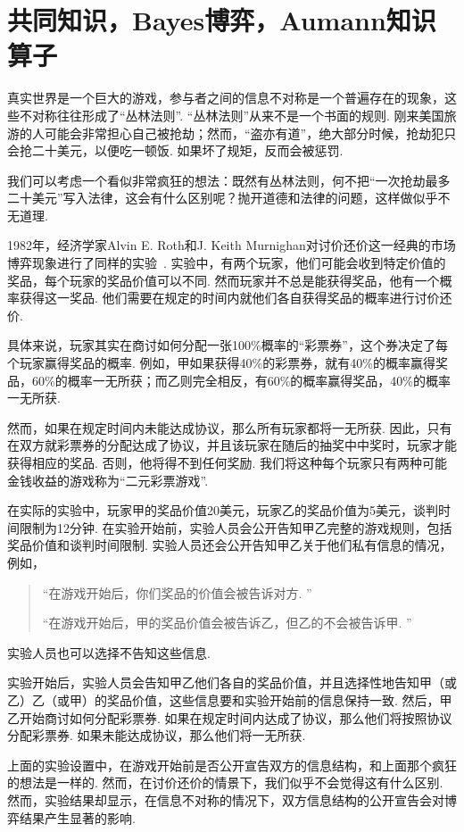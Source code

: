 \chapter{共同知识，Bayes博弈，Aumann知识算子}\label{chap:bayesian-game}

真实世界是一个巨大的游戏，参与者之间的信息不对称是一个普遍存在的现象，这些不对称往往形成了“丛林法则”. “丛林法则”从来不是一个书面的规则. 刚来美国旅游的人可能会非常担心自己被抢劫；然而，“盗亦有道”，绝大部分时候，抢劫犯只会抢二十美元，以便吃一顿饭. 如果坏了规矩，反而会被惩罚. 

我们可以考虑一个看似非常疯狂的想法：既然有丛林法则，何不把“一次抢劫最多二十美元”写入法律，这会有什么区别呢？抛开道德和法律的问题，这样做似乎不无道理. 

1982年，经济学家Alvin E. Roth和J. Keith Murnighan对讨价还价这一经典的市场博弈现象进行了同样的实验~\cite{rothRoleInformationBargaining1982}. 实验中，有两个玩家，他们可能会收到特定价值的奖品，每个玩家的奖品价值可以不同. 然而玩家并不总是能获得奖品，他有一个概率获得这一奖品. 他们需要在规定的时间内就他们各自获得奖品的概率进行讨价还价. 

具体来说，玩家其实在商讨如何分配一张100\%概率的“彩票券”，这个券决定了每个玩家赢得奖品的概率. 例如，甲如果获得40\%的彩票券，就有40\%的概率赢得奖品，60\%的概率一无所获；而乙则完全相反，有60\%的概率赢得奖品，40\%的概率一无所获. 

然而，如果在规定时间内未能达成协议，那么所有玩家都将一无所获. 因此，只有在双方就彩票券的分配达成了协议，并且该玩家在随后的抽奖中中奖时，玩家才能获得相应的奖品. 否则，他将得不到任何奖励. 我们将这种每个玩家只有两种可能金钱收益的游戏称为“二元彩票游戏”. 

在实际的实验中，玩家甲的奖品价值20美元，玩家乙的奖品价值为5美元，谈判时间限制为12分钟. 在实验开始前，实验人员会公开告知甲乙完整的游戏规则，包括奖品价值和谈判时间限制. 实验人员还会公开告知甲乙关于他们私有信息的情况，例如，
\begin{quotation}
    “在游戏开始后，你们奖品的价值会被告诉对方. ”

    “在游戏开始后，甲的奖品价值会被告诉乙，但乙的不会被告诉甲. ”
\end{quotation}
实验人员也可以选择不告知这些信息. 

实验开始后，实验人员会告知甲乙他们各自的奖品价值，并且选择性地告知甲（或乙）乙（或甲）的奖品价值，这些信息要和实验开始前的信息保持一致. 然后，甲乙开始商讨如何分配彩票券. 如果在规定时间内达成了协议，那么他们将按照协议分配彩票券. 如果未能达成协议，那么他们将一无所获. 

上面的实验设置中，在游戏开始前是否公开宣告双方的信息结构，和上面那个疯狂的想法是一样的. 然而，在讨价还价的情景下，我们似乎不会觉得这有什么区别. 然而，实验结果却显示，在信息不对称的情况下，双方信息结构的公开宣告会对博弈结果产生显著的影响. 


